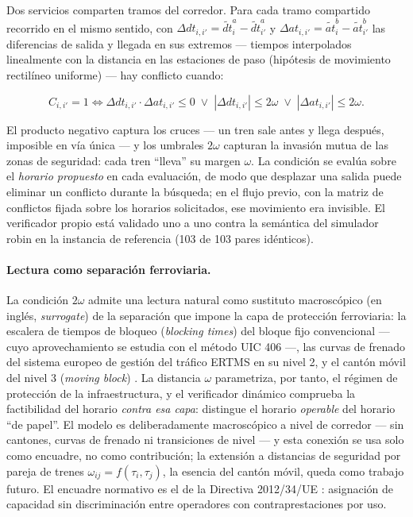 \documentclass[11pt,a4paper]{article}
\begin{document}
Dos servicios comparten tramos del corredor. Para cada tramo compartido
recorrido en el mismo sentido, con $\Delta dt_{i,i'} =
\tilde{dt}_i^{a} - \tilde{dt}_{i'}^{a}$ y $\Delta at_{i,i'} =
\tilde{at}_i^{b} - \tilde{at}_{i'}^{b}$ las diferencias de salida y llegada
en sus extremos --- tiempos interpolados linealmente con la distancia en
las estaciones de paso (hipótesis de movimiento rectilíneo uniforme) --- hay
conflicto cuando:

\begin{equation}
C_{i,i'} = 1 \iff
\Delta dt_{i,i'} \cdot \Delta at_{i,i'} \le 0
\;\lor\; |\Delta dt_{i,i'}| \le 2\omega
\;\lor\; |\Delta at_{i,i'}| \le 2\omega.
\label{ec:conflicto}
\end{equation}

El producto negativo captura los cruces --- un tren sale antes y llega
después, imposible en vía única --- y los umbrales $2\omega$ capturan la
invasión mutua de las zonas de seguridad: cada tren ``lleva'' su margen
$\omega$. La condición se evalúa sobre el \emph{horario propuesto} en cada
evaluación, de modo que desplazar una salida puede eliminar un conflicto
durante la búsqueda; en el flujo previo, con la matriz de conflictos fijada
sobre los horarios solicitados, ese movimiento era invisible. El
verificador propio está validado uno a uno contra la semántica del
simulador robin en la instancia de referencia (103 de 103 pares
idénticos).

\paragraph{Lectura como separación ferroviaria.} La condición $2\omega$
admite una lectura natural como sustituto macroscópico (en inglés,
\emph{surrogate}) de la separación que impone la capa de protección
ferroviaria: la escalera de tiempos de bloqueo (\emph{blocking times}) del
bloque fijo convencional --- cuyo aprovechamiento se estudia con el método
UIC 406 \cite{uic406} ---, las curvas de frenado del sistema europeo de
gestión del tráfico ERTMS en su nivel 2, y el cantón móvil del nivel 3
(\emph{moving block}) \cite{besinovic2021,vanaken2017}. La distancia
$\omega$ parametriza, por tanto, el régimen de protección de la
infraestructura, y el verificador dinámico comprueba la factibilidad del
horario \emph{contra esa capa}: distingue el horario \emph{operable} del
horario ``de papel''. El modelo es deliberadamente macroscópico a nivel de
corredor --- sin cantones, curvas de frenado ni transiciones de nivel --- y
esta conexión se usa solo como encuadre, no como contribución; la
extensión a distancias de seguridad por pareja de trenes
$\omega_{ij} = f(\tau_i, \tau_j)$, la esencia del cantón móvil, queda como
trabajo futuro. El encuadre normativo es el de la Directiva
2012/34/UE \cite{directiva201234}: asignación de capacidad sin
discriminación entre operadores con contraprestaciones por uso.
\end{document}
